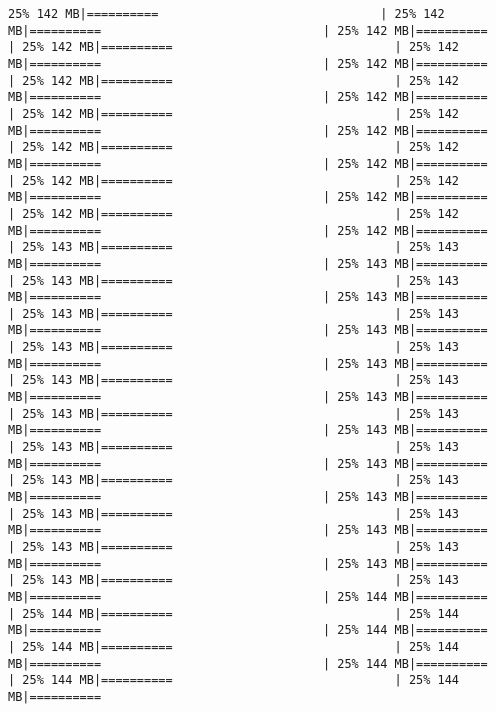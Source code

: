\documentclass[
]{article}
\begin{document}
\begin{verbatim}
25% 142 MB|==========                               | 25% 142 MB|==========                               | 25% 142 MB|==========                               | 25% 142 MB|==========                               | 25% 142 MB|==========                               | 25% 142 MB|==========                               | 25% 142 MB|==========                               | 25% 142 MB|==========                               | 25% 142 MB|==========                               | 25% 142 MB|==========                               | 25% 142 MB|==========                               | 25% 142 MB|==========                               | 25% 142 MB|==========                               | 25% 142 MB|==========                               | 25% 142 MB|==========                               | 25% 142 MB|==========                               | 25% 142 MB|==========                               | 25% 142 MB|==========                               | 25% 142 MB|==========                               | 25% 142 MB|==========                               | 25% 142 MB|==========                               | 25% 143 MB|==========                               | 25% 143 MB|==========                               | 25% 143 MB|==========                               | 25% 143 MB|==========                               | 25% 143 MB|==========                               | 25% 143 MB|==========                               | 25% 143 MB|==========                               | 25% 143 MB|==========                               | 25% 143 MB|==========                               | 25% 143 MB|==========                               | 25% 143 MB|==========                               | 25% 143 MB|==========                               | 25% 143 MB|==========                               | 25% 143 MB|==========                               | 25% 143 MB|==========                               | 25% 143 MB|==========                               | 25% 143 MB|==========                               | 25% 143 MB|==========                               | 25% 143 MB|==========                               | 25% 143 MB|==========                               | 25% 143 MB|==========                               | 25% 143 MB|==========                               | 25% 143 MB|==========                               | 25% 143 MB|==========                               | 25% 143 MB|==========                               | 25% 143 MB|==========                               | 25% 143 MB|==========                               | 25% 143 MB|==========                               | 25% 143 MB|==========                               | 25% 143 MB|==========                               | 25% 143 MB|==========                               | 25% 143 MB|==========                               | 25% 144 MB|==========                               | 25% 144 MB|==========                               | 25% 144 MB|==========                               | 25% 144 MB|==========                               | 25% 144 MB|==========                               | 25% 144 MB|==========                               | 25% 144 MB|==========                               | 25% 144 MB|==========                               | 25% 144 MB|==========    
\end{verbatim}
\end{document}
